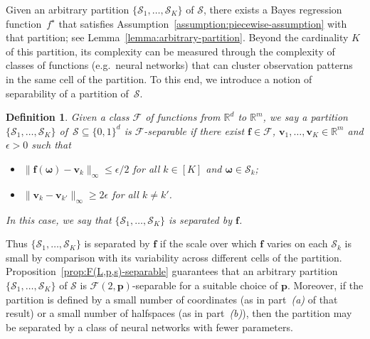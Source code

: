 \documentclass[12pt]{article}
\newtheorem{defn}{Definition}
\begin{document}
Given an arbitrary partition $\{\mathcal{S}_1,\ldots,\mathcal{S}_K\}$ of $\mathcal{S}$, there exists a Bayes regression function~$f^{\star}$ that satisfies Assumption~\ref{assumption:piecewise-assumption} with that partition; see Lemma~\ref{lemma:arbitrary-partition}. 
Beyond the cardinality $K$ of this partition, its complexity can be measured through the complexity of classes of functions (e.g.~neural networks) that can cluster observation patterns in the same cell of the partition.  To this end, we introduce a notion of separability of a partition of~$\mathcal{S}$.
\begin{defn} \label{defn:F(L,p,s)-separable}
Given a class $\mathcal{F}$ of functions from $\mathbb{R}^d$ to $\mathbb{R}^m$, we say a partition $\{\mathcal{S}_1,\ldots,\mathcal{S}_K\}$ of~$\mathcal{S} \subseteq \{0,1\}^d$ is \emph{$\mathcal{F}$-separable} if there exist $\bm f \in \mathcal{F}$, $\bm v_1,\ldots,\bm v_K \in \mathbb{R}^m$ and $\epsilon>0$ such that 
    \begin{itemize}
        \item[(i)] $\|\bm f(\bm\omega) - \bm v_k\|_{\infty} \leq \epsilon/2$ for all $k\in[K]$ and $\bm\omega \in \mathcal{S}_k$;
        \item[(ii)] $\|\bm v_k - \bm v_{k'}\|_{\infty} \geq 2\epsilon$ for all $k \neq k'$.
    \end{itemize}
    In this case, we say that $\{\mathcal{S}_1,\ldots,\mathcal{S}_K\}$ is separated by $\bm f$.
\end{defn}
Thus $\{\mathcal{S}_1,\ldots,\mathcal{S}_K\}$ is separated by $\bm f$ if the scale over which $\bm f$ varies on each $\mathcal{S}_k$ is small by comparison with its variability across different cells of the partition. Proposition~\ref{prop:F(L,p,s)-separable} guarantees that an arbitrary partition $\{\mathcal{S}_1, \ldots, \mathcal{S}_K\}$ of $\mathcal{S}$ is $\mathcal{F}(2,\bm p)$-separable for a suitable choice of $\bm p$. Moreover, if the partition is defined by a small number of coordinates (as in part~\emph{(a)} of that result) or a small number of halfspaces (as in part~\emph{(b)}), then the partition may be separated by a class of neural networks with fewer parameters.
\end{document}
